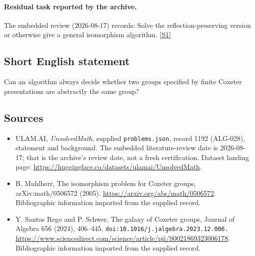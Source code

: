 \documentclass[11pt,a4paper]{article}
\newcommand{\sref}[2]{\hyperlink{source:#1:#2}{[S#2]}}
\begin{document}
\paragraph{Residual task reported by the archive.}

The embedded review (2026-08-17) records: Solve the reflection-preserving version or otherwise give a general isomorphism algorithm. \sref{1192}{1}

\subsection{Short English statement}

Can an algorithm always decide whether two groups specified by finite Coxeter presentations are abstractly the same group?

\subsection{Sources}

{\small

\begin{itemize}

\item[\hypertarget{source:1192:1}{S1}] ULAM.AI, \emph{UnsolvedMath}, supplied \texttt{problems.json}, record 1192 (ALG-028), statement and background. The embedded literature-review date is 2026-08-17; that is the archive’s review date, not a fresh certification. Dataset landing page: \url{https://huggingface.co/datasets/ulamai/UnsolvedMath}.

\item[\hypertarget{source:1192:2}{S2}] B. Muhlherr, The isomorphism problem for Coxeter groups, arXiv:math/0506572 (2005). \url{https://arxiv.org/abs/math/0506572}. Bibliographic information imported from the supplied record.

\item[\hypertarget{source:1192:3}{S3}] Y. Santos Rego and P. Schwer, The galaxy of Coxeter groups, Journal of Algebra 656 (2024), 406--445, \nolinkurl{doi:10.1016/j.jalgebra.2023.12.006.} \url{https://www.sciencedirect.com/science/article/pii/S0021869323006178}. Bibliographic information imported from the supplied record.

\end{itemize}

}

\label{end:1192}
\end{document}
